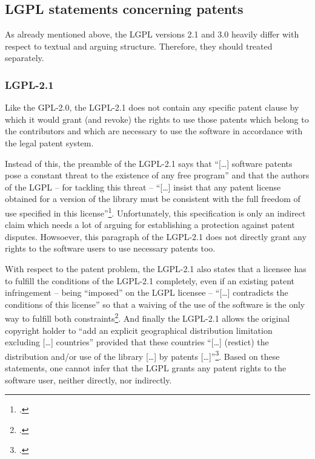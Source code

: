 \subsection{LGPL statements concerning patents}

As already mentioned above, the LGPL versions 2.1 and 3.0 heavily differ  with
respect to textual and arguing structure. Therefore, they should treated
separately.

\subsubsection {LGPL-2.1} \label{subsec:Lgpl21PatentClause}

Like the GPL-2.0, the LGPL-2.1 does not contain any specific patent clause by
which it would grant (and revoke) the rights to use those patents which belong
to the contributors and  which are necessary to use the software in accordance
with the legal patent system.

Instead of this, the preamble of the LGPL-2.1 says that \enquote{[\ldots]
software patents pose a constant threat to the existence of any free program}
and that the authors of the LGPL -- for tackling this threat --
\enquote{[\ldots] insist that any patent license obtained for a version of the
library must be consistent with the full freedom of use specified in this
license}\footcite[cf.][\nopage wp., Preamble]{Lgpl21OsiLicense1991a}.
Unfortunately, this specification is only an indirect claim which needs a lot of
arguing for establishing a protection against patent disputes.
Howsoever, this paragraph of the LGPL-2.1 does not directly grant any rights to
the software users to use necessary patents too.

With respect to the patent problem, the LGPL-2.1 also states that a licensee has
to fulfill the conditions of the LGPL-2.1 completely, even if an existing patent
infringement -- being \enquote{imposed} on the LGPL licensee --
\enquote{[\ldots] contradicts the conditions of this license} so that a waiving
of the use of the software is the only way to fulfill both
constraints\footcite[cf.][\nopage wp.\ §11]{Lgpl21OsiLicense1991a}. And finally
the LGPL-2.1 allows the original copyright holder to \enquote{add an explicit
geographical distribution limitation excluding [\ldots] countries} provided that
these countries \enquote{[\ldots] (restict) the distribution and/or use of the
library [\ldots] by patents [\ldots]}\footcite[cf.][\nopage wp.\
§12]{Lgpl21OsiLicense1991a}. Based on these statements, one cannot infer that
the LGPL grants any patent rights to the software user, neither directly, nor
indirectly.

